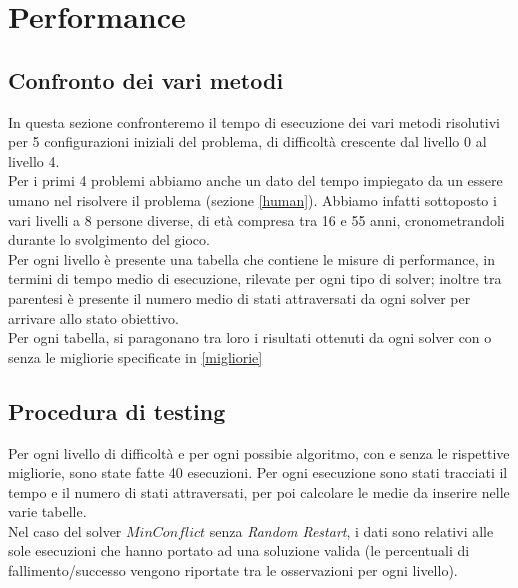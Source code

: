 
\chapter{Performance}
\label{cap:performance}
\section{Confronto dei vari metodi}
In questa sezione confronteremo il tempo di esecuzione dei vari metodi risolutivi per 5 configurazioni iniziali del problema, di difficoltà crescente dal livello 0 al livello 4.\\
Per i primi 4 problemi abbiamo anche un dato del tempo impiegato da un essere umano nel risolvere il problema (sezione \ref{human}). Abbiamo infatti sottoposto i vari livelli a 8 persone diverse, di età compresa tra 16 e 55 anni, cronometrandoli durante lo svolgimento del gioco.\\
Per ogni livello è presente una tabella che contiene le misure di performance, in termini di tempo medio di esecuzione, rilevate per ogni tipo di solver; inoltre tra parentesi è presente il numero medio di stati attraversati da ogni solver per arrivare allo stato obiettivo. \\
Per ogni tabella, si paragonano tra loro i risultati ottenuti da ogni solver con o senza le migliorie specificate in \ref{migliorie}

\section{Procedura di testing}
Per ogni livello di difficoltà e per ogni possibie algoritmo, con e senza le rispettive migliorie, sono state fatte 40 esecuzioni. Per ogni esecuzione sono stati tracciati il tempo e il numero di stati attraversati, per poi calcolare le medie da inserire nelle varie tabelle.\\
Nel caso del solver $MinConflict$ senza \textit{Random Restart}, i dati sono relativi alle sole esecuzioni che hanno portato ad una soluzione valida (le percentuali di fallimento/successo vengono riportate tra le osservazioni per ogni livello).

